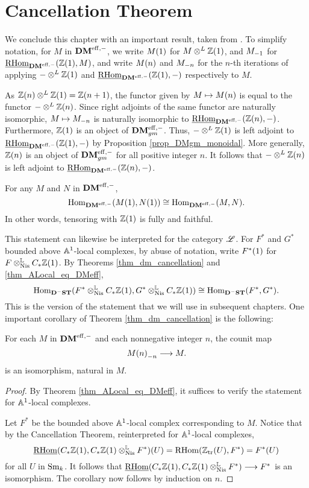 \section{Cancellation Theorem}
\label{sect_cancellation}

We conclude this chapter with an important result, taken from
\cite[Corollary 4.10]{V02}. To simplify notation, for $M$ in 
$\DMeff$, we write $\tZ{M}$ for $M \tDM \Z(1)$, and $\hZ{M}$ for 
$\ihomDMf(\Z(1), M)$, and write $\tZ[n]{M}$ and $\hZ[n]{M}$ for 
the $n$-th iterations of applying $- \tDM \Z(1)$ and 
$\ihomDMf(\Z(1), -)$ respectively to $M$. 

As $\Z(n) \tDM \Z(1) = \Z(n + 1)$, the functor given by $M \mapsto 
\tZ[n]{M}$ is equal to the functor $- \tDM \Z(n)$. Since right 
adjoints of the same functor are naturally isomorphic, $M \mapsto 
\hZ[n]{M}$ is naturally isomorphic to $\ihomDMf(\Z(n), -)$. 
Furthermore, $\Z(1)$ is an object of $\DMeffgm$. Thus, $- \tDM 
\Z(1)$ is left adjoint to $\ihomDMf(\Z(1), -)$ by Proposition
\ref{prop_DMgm_monoidal}. More generally, $\Z(n)$ is an object
of $\DMeffgm$ for all positive integer $n$. It follows that
$-\tDM \Z(n)$ is left adjoint to $\ihomDMf(\Z(n), -)$.

\begin{thm}[Cancellation]\label{thm_dm_cancellation}
For any $M$ and $N$ in $\DMeff$,
\[
\homDMf(\tZ{M}, \tZ{N}) \cong \homDMf(M, N).
\]
In other words, tensoring with $\Z(1)$ is fully and faithful.
\end{thm}

This statement can likewise be interpreted for the category 
$\ALocal$. For $F^*$ and $G^*$ bounded above $\A^1$-local 
complexes, by abuse of notation, write $\tZ{F^*}$ for
$F \tLNis \suslC \Z(1)$. By Theorems \ref{thm_dm_cancellation}
and \ref{thm_ALocal_eq_DMeff}, 
\[
\hom_{\DShCor}(F^* \tLNis \suslC \Z(1), G^* \tLNis \suslC \Z(1))
\cong \hom_{\DShCor}(F^*, G^*).
\]
This is the version of the statement that we will use in
subsequent chapters. One important corollary of Theorem
\ref{thm_dm_cancellation} is the following:

\begin{cor}\label{cor_tZ_hZ_eq_id}
For each $M$ in $\DMeff$ and each nonnegative integer $n$, 
the counit map
\[
\hZ[n]{\tZ[n]{M}} \to M.
\]
is an isomorphism, natural in $M$.
\end{cor}
\begin{proof}
By Theorem \ref{thm_ALocal_eq_DMeff}, it suffices to verify the
statement for $\A^1$-local complexes. 

Let $F^*$ be the bounded above $\A^1$-local complex corresponding 
to $M$. Notice that by the Cancellation Theorem, reinterpreted for
$\A^1$-local complexes,
\[
\sheaf{\rhom}(\suslC \Z(1), \suslC \Z(1) \tLNis F^*)(U) = 
\rhom(\Ztr(U), F^*) = F^*(U)
\]
for all $U$ in $\Sm$. It follows that $\sheaf{\rhom}(\suslC\Z(1),
\suslC\Z(1) \tLNis F^*) \to F^*$ is an isomorphism. The
corollary now follows by induction on $n$.
\end{proof}
